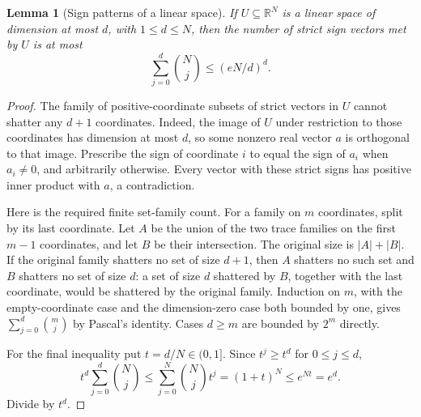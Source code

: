 \documentclass[11pt]{article}
\newtheorem{lemma}[theorem]{Lemma}
\begin{document}
\begin{lemma}[Sign patterns of a linear space]
If $U\subseteq\mathbb R^N$ is a linear space of dimension at most
$d$, with $1\le d\le N$, then the number of strict sign vectors
met by $U$ is at most
\[
 \sum_{j=0}^d {N\choose j}\le (eN/d)^d.
\]
\end{lemma}
\begin{proof}
The family of positive-coordinate subsets of strict vectors in $U$
cannot shatter any $d+1$ coordinates. Indeed, the image of $U$ under
restriction to those coordinates has dimension at most $d$, so some
nonzero real vector $a$ is orthogonal to that image. Prescribe the sign
of coordinate $i$ to equal the sign of $a_i$ when $a_i\ne0$, and
arbitrarily otherwise. Every vector with these strict signs has
positive inner product with $a$, a contradiction.

Here is the required finite set-family count. For a family on $m$
coordinates, split by its last coordinate. Let $A$ be the union of
the two trace families on the first $m-1$ coordinates, and let $B$
be their intersection. The original size is $|A|+|B|$. If the original
family shatters no set of size $d+1$, then $A$ shatters no such set
and $B$ shatters no set of size $d$: a set of size $d$ shattered by
$B$, together with the last coordinate, would be shattered by the
original family. Induction on $m$, with the empty-coordinate case
and the dimension-zero case both bounded by one, gives
$\sum_{j=0}^d {m\choose j}$ by Pascal's identity. Cases $d\ge m$
are bounded by $2^m$ directly.

For the final inequality put $t=d/N\in(0,1]$. Since $t^j\ge t^d$
for $0\le j\le d$,
\[
 t^d\sum_{j=0}^d {N\choose j}
 \le \sum_{j=0}^N {N\choose j}t^j
 =(1+t)^N\le e^{Nt}=e^d.
\]
Divide by $t^d$.
\end{proof}
\end{document}
